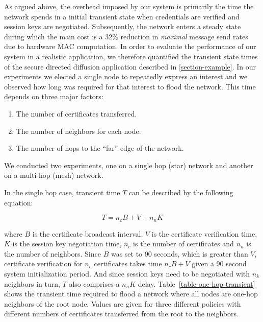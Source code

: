 As argued above, the overhead imposed by our system is primarily the
time the network spends in a initial transient state when credentials
are verified and session keys are negotiated. Subsequently, the network
enters a steady state during which the main cost is a 32\% reduction in
\emph{maximal} message send rates due to hardware MAC computation. In
order to evaluate the performance of our system in a realistic
application, we therefore quantified the transient state times of the
secure directed diffusion application described in
\autoref{section-example}. In our experiments we elected a single node
to repeatedly express an interest and we observed how long was required
for that interest to flood the network. This time depends on three major
factors:
\begin{enumerate}
\item The number of certificates transferred.
\item The number of neighbors for each node.
\item The number of hops to the ``far'' edge of the network.
\end{enumerate}
We conducted two experiments, one on a single hop (star) network and 
another on a multi-hop (mesh) network.

In the single hop case, transient time $T$ can be described by the
following equation:

\begin{displaymath}
T = n_c B + V + n_n K
\end{displaymath}

where $B$ is the certificate broadcast interval, $V$ is the certificate
verification time, $K$ is the session key negotiation time, $n_c$ is the
number of certificates and $n_n$ is the number of neighbors. Since $B$
was set to 90 seconds, which is greater than $V$, certificate
verification for $n_c$ certificates takes time $n_c B + V$ given a 90
second system initialization period. And since session keys need to be
negotiated with $n_k$ neighbors in turn, $T$ also comprises a $n_nK$
delay. Table~\ref{table-one-hop-transient} shows the transient time
required to flood a network where all nodes are one-hop neighbors of the
root node. Values are given for three different policies with different
numbers of certificates transferred from the root to the neighbors.

